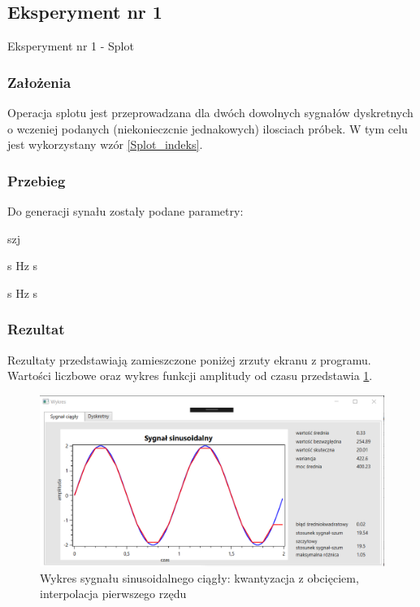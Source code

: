 \documentclass[12pt]{article}
\begin{document}
\subsection{Eksperyment nr 1}

Eksperyment nr 1 -  Splot\\


\subsubsection{Założenia}
Operacja splotu jest przeprowadzana dla dwóch dowolnych sygnałów dyskretnych o wczeniej podanych (niekonieczcnie jednakowych) ilosciach próbek. W tym celu jest wykorzystany wzór \ref{Splot_indeks}.

\subsubsection{Przebieg}
Do generacji synału zostały podane parametry:

\begin{labeling}{szj}
\item [Sygnał 1:]
 s
 Hz
 s

\item [Sygnał 2:]
 s
 Hz
 s
\end{labeling}

\subsubsection{Rezultat}

Rezultaty przedstawiają zamieszczone poniżej zrzuty ekranu z programu. Wartości liczbowe oraz wykres funkcji amplitudy od czasu przedstawia \ref{Wykres dla wynikw eksperymentu pierwszego}.
\begin{figure}[h!]
 \centering
 \includegraphics[width=12.3cm]{SinKwantObcIntA2T2f10H2t1C.PNG}
 \vspace{-0.3cm}
 \caption{Wykres sygnału sinusoidalnego ciągły: kwantyzacja z obcięciem, interpolacja pierwszego rzędu}
 \label{Wykres dla wynikw eksperymentu pierwszego}
\end{figure}
\end{document}
